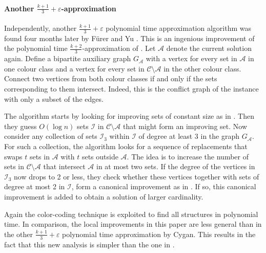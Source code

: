 \paragraph{Another $\frac{k+1}{3} + \varepsilon$-approximation} Independently, another $\frac{k+1}{3} + \varepsilon$ polynomial time approximation algorithm was found four months later by F\"{u}rer and Yu \cite{FurerYu}. This is an ingenious improvement of the polynomial time $\frac{k+2}{3}$-approximation of \cite{Sviridenko}. Let $\mathcal{A}$ denote the current solution again. Define a bipartite auxiliary graph $G_\mathcal{A}$ with a vertex for every set in $\mathcal{A}$ in one colour class and a vertex for every set in $\mathcal{C} \setminus \mathcal{A}$ in the other colour class. Connect two vertices from both colour classes if and only if the sets corresponding to them intersect. Indeed, this is the conflict graph of the instance with only a subset of the edges.

The algorithm starts by looking for improving sets of constant size as in \cite{HurkensSchrijver}. Then they guess $O(\log n)$ sets $\mathcal{I}$ in $\mathcal{C} \setminus \mathcal{A}$ that might form an improving set. Now consider any collection of sets $\mathcal{I}_3$ within $\mathcal{I}$ of degree at least 3 in the graph $G_\mathcal{A}$. For such a collection, the algorithm looks for a sequence of replacements that swaps $t$ sets in $\mathcal{A}$ with $t$ sets outside $\mathcal{A}$. The idea is to increase the number of sets in $\mathcal{C} \setminus \mathcal{A}$ that intersect $\mathcal{A}$ in at most two sets. If the degree of the vertices in $\mathcal{I}_3$ now drops to 2 or less, they check whether these vertices together with sets of degree at most 2 in $\mathcal{I}$, form a canonical improvement as in \cite{Sviridenko}. If so, this canonical improvement is added to obtain a solution of larger cardinality.

Again the color-coding technique is exploited to find all structures in polynomial time. In comparison, the local improvements in this paper are less general than in the other $\frac{k+1}{3} + \varepsilon$ polynomial time approximation by Cygan. This results in the fact that this new analysis is simpler than the one in \cite{Cygan}.


